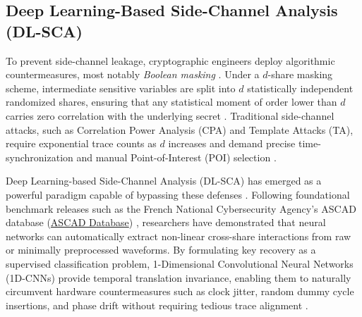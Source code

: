 \documentclass[letterpaper]{article}
\begin{document}
\subsection{Deep Learning-Based Side-Channel Analysis (DL-SCA)}
To prevent side-channel leakage, cryptographic engineers deploy algorithmic countermeasures, most notably \textit{Boolean masking} \cite{chari1999towards,barthe2015formal}. Under a $d$-share masking scheme, intermediate sensitive variables are split into $d$ statistically independent randomized shares, ensuring that any statistical moment of order lower than $d$ carries zero correlation with the underlying secret \cite{bronchain2020side}. Traditional side-channel attacks, such as Correlation Power Analysis (CPA) and Template Attacks (TA), require exponential trace counts as $d$ increases and demand precise time-synchronization and manual Point-of-Interest (POI) selection \cite{brier2004correlation,standaert2009unified}.

Deep Learning-based Side-Channel Analysis (DL-SCA) has emerged as a powerful paradigm capable of bypassing these defenses \cite{maghrebi2016deep,cagli2017convolutional,benadjila2020deep}. Following foundational benchmark releases such as the French National Cybersecurity Agency's ASCAD database (\href{https://github.com/ANSSI-FR/ascad}{ASCAD Database}) \cite{ascaddatabase2018,benadjila2020deep}, researchers have demonstrated that neural networks can automatically extract non-linear cross-share interactions from raw or minimally preprocessed waveforms. By formulating key recovery as a supervised classification problem, 1-Dimensional Convolutional Neural Networks (1D-CNNs) provide temporal translation invariance, enabling them to naturally circumvent hardware countermeasures such as clock jitter, random dummy cycle insertions, and phase drift without requiring tedious trace alignment \cite{cagli2017convolutional,kim2019make,perin2020neural,wouters2020revisiting,zaid2020methodology,masure2020comprehensive,robyns2019improving,wu2022removing,picek2023deep}.
\end{document}
